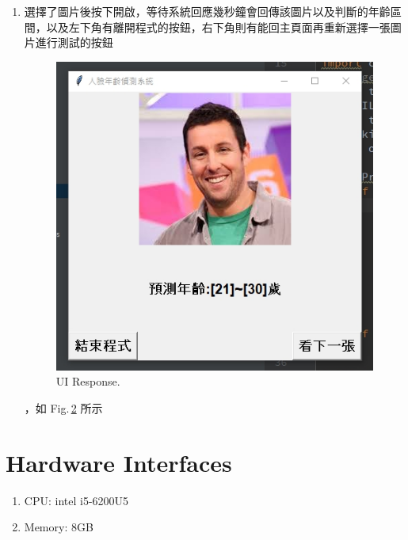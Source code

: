 \documentclass{scrreprt}
\begin{document}
\begin{CJK}{UTF8}{bkai}
\begin{enumerate}
\begin{figure}[htb]
\begin{center}
        \end{center}
        \caption{UI Select File Window.}
        \label{fig:2}
    \end{figure}
    ，如 Fig.\,\ref{fig:2} 所示\\
    \vspace{6.5cm}
    \item 選擇了圖片後按下開啟，等待系統回應幾秒鐘會回傳該圖片以及判斷的年齡區間，以及左下角有離開程式的按鈕，右下角則有能回主頁面再重新選擇一張圖片進行測試的按鈕
    \begin{figure}[htb]
        \begin{center}
            \includegraphics[scale=0.8]{image/UiResponse.png}%
        \end{center}
        \caption{UI Response.}
        \label{fig:3}
    \end{figure}
    ，如 Fig.\,\ref{fig:3} 所示\\
\end{enumerate}

\section{Hardware Interfaces}
\begin{enumerate}
    \item CPU: intel i5-6200U5
    \item Memory: 8GB
\end{enumerate}


\end{CJK}
\end{document}
